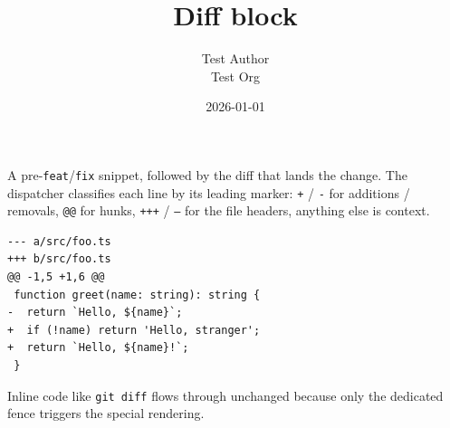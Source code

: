 \documentclass[11pt,a4paper]{article}
\title{Diff block}
\author{Test Author \\ Test Org}
\date{2026-01-01}
\theoremstyle{definition}
\begin{document}
\maketitle

A pre-\texttt{feat}/\texttt{fix} snippet, followed by the diff that lands the
change. The dispatcher classifies each line by its leading marker:
\texttt{+} / \texttt{-} for additions / removals, \texttt{@@} for hunks, \texttt{+++} / \texttt{---}
for the file headers, anything else is context.


\begin{lstlisting}
--- a/src/foo.ts
+++ b/src/foo.ts
@@ -1,5 +1,6 @@
 function greet(name: string): string {
-  return `Hello, ${name}`;
+  if (!name) return 'Hello, stranger';
+  return `Hello, ${name}!`;
 }
\end{lstlisting}


Inline code like \texttt{git diff} flows through unchanged because only
the dedicated fence triggers the special rendering.
\end{document}
